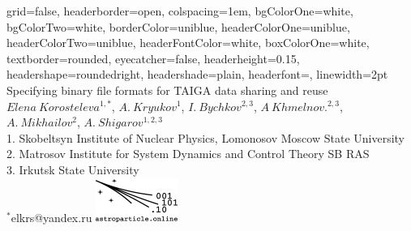 \documentclass[a0paper,portrait]{baposter}
\begin{document}


\begin{poster}
{
grid=false,
headerborder=open, %
colspacing=1em, %
bgColorOne=white, %
bgColorTwo=white, %
borderColor=uniblue, %
headerColorOne=uniblue, %
headerColorTwo=uniblue, %
headerFontColor=white, %
boxColorOne=white, %
textborder=rounded, %
eyecatcher=false, %
headerheight=0.15\textheight, %
headershape=roundedright, %
headershade=plain,
headerfont=\Large\textsf, %
linewidth=2pt %
}
{}
%
%
{
\textsf %
{Specifying binary file formats for TAIGA data sharing and reuse
}
} 
{\sf\vspace{0em}\\
$Elena~Korosteleva^{1,*}$, $A.~Kryukov^{1}$, $I.~Bychkov^{2,3}$, $A~Khmelnov.^{2,3}$, $A.~Mikhailov^{2}$, $A.~Shigarov^{1,2,3}$
\vspace{0.1em}\\
\small{1. Skobeltsyn Institute of Nuclear Physics, Lomonosov Moscow State University\\
2. Matrosov Institute for System Dynamics and Control Theory SB RAS\\
3. Irkutsk State University
\vspace{0.0em}\\
$^*$elkrs@yandex.ru}
}
{\includegraphics[width=0.20\textwidth]{logo_var1.pdf}
}
 

\end{poster}
\end{document}
